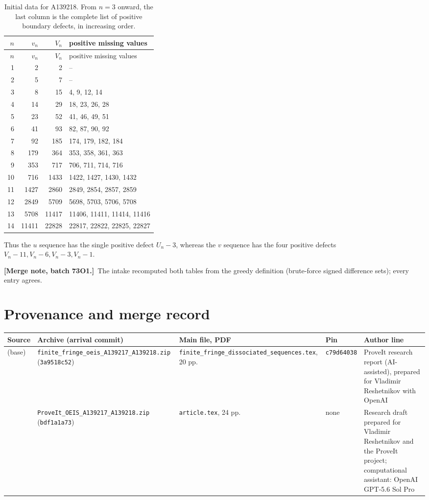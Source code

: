 \documentclass[11pt,a4paper]{article}
\numberwithin{equation}{section}
\theoremstyle{definition}
\theoremstyle{remark}
\theoremstyle{plain}
\newcommand{\mergenote}[1]{\par\smallskip\noindent\textbf{[Merge note, batch 73O1.]}\ #1\par\smallskip}
\newcommand{\file}[1]{\nolinkurl{#1}}
\begin{document}
\begin{longtable}{r r r l}
\caption{Initial data for A139218.  From $n=3$ onward, the last column is the complete list of positive boundary defects, in increasing order.}\label{gdf:tab:data-v}\\
\toprule
$n$&$v_n$&$V_n$&positive missing values\\
\midrule
\endfirsthead
\toprule
$n$&$v_n$&$V_n$&positive missing values\\
\midrule
\endhead
1&2&2&--\\
2&5&7&--\\
3&8&15&4, 9, 12, 14\\
4&14&29&18, 23, 26, 28\\
5&23&52&41, 46, 49, 51\\
6&41&93&82, 87, 90, 92\\
7&92&185&174, 179, 182, 184\\
8&179&364&353, 358, 361, 363\\
9&353&717&706, 711, 714, 716\\
10&716&1433&1422, 1427, 1430, 1432\\
11&1427&2860&2849, 2854, 2857, 2859\\
12&2849&5709&5698, 5703, 5706, 5708\\
13&5708&11417&11406, 11411, 11414, 11416\\
14&11411&22828&22817, 22822, 22825, 22827\\
\bottomrule
\end{longtable}

Thus the $u$ sequence has the single positive defect $U_n-3$, whereas the $v$
sequence has the four positive defects $V_n-11,V_n-6,V_n-3,V_n-1$.
\mergenote{The intake recomputed both tables from the greedy definition
(brute-force signed difference sets); every entry agrees.}

\section{Provenance and merge record}\label{gdf:app:prov}

\begin{center}
\small
\begin{tabular}{>{\raggedright\arraybackslash}p{1.2cm}>{\raggedright\arraybackslash}p{4.0cm}>{\raggedright\arraybackslash}p{3.3cm}>{\raggedright\arraybackslash}p{1.8cm}>{\raggedright\arraybackslash}p{3.3cm}}
\toprule
Source & Archive (arrival commit) & Main file, PDF & Pin & Author line\\
\midrule
50 (base) & \file{finite_fringe_oeis_A139217_A139218.zip} (\texttt{3a9518c52}) &
  \file{finite_fringe_dissociated_sequences.tex}, 20 pp. &
  \texttt{c79d64038} & ProveIt research report (AI-assisted), prepared for
  Vladimir Reshetnikov with OpenAI\\
43 & \file{ProveIt_OEIS_A139217_A139218.zip} (\texttt{bdf1a1a73}) &
  \file{article.tex}, 24 pp. & none & Research draft prepared for Vladimir
  Reshetnikov and the ProveIt project; computational assistant: OpenAI
  GPT-5.6 Sol Pro\\
\bottomrule
\end{tabular}
\end{center}
\end{document}
